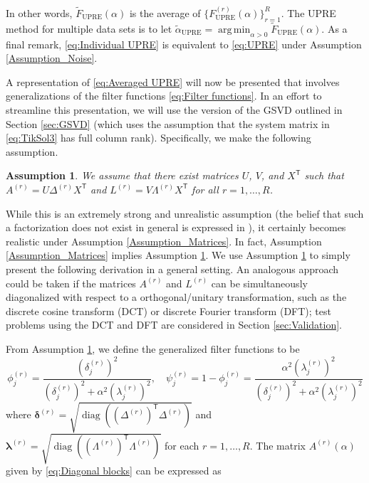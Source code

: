 \documentclass[12pt]{article}
\newcommand{\trans}[1]{{#1}^\mathsf{T}}	%
\DeclareMathOperator{\diag}{diag}	%
\newcommand{\regparam}{\alpha}  %
\DeclareMathOperator*{\argmin}{arg\,min}
\newcommand{\filt}{\phi}
\newcommand{\mfilt}{\psi}
\newcommand{\U}{F_{\text{UPRE}}}	%
\newcommand{\UBig}{\widetilde{F}_{\text{UPRE}}}	%
\newtheorem{assumption}{Assumption}
\begin{document}
\noindent In other words, $\UBig(\regparam)$ is the average of $\{\U^{(r)}(\regparam)\}_{r=1}^R$. The UPRE method for multiple data sets is to let $\widetilde{\regparam}_{\textrm{UPRE}} = \argmin_{\regparam > 0} \UBig(\regparam)$. As a final remark, \eqref{eq:Individual UPRE} is equivalent to \eqref{eq:UPRE} under Assumption \ref{Assumption_Noise}. \par
A representation of \eqref{eq:Averaged UPRE} will now be presented that involves generalizations of the filter functions \eqref{eq:Filter functions}. In an effort to streamline this presentation, we will use the version of the GSVD outlined in Section \ref{sec:GSVD} (which uses the assumption that the system matrix in \eqref{eq:TikSol3} has full column rank). Specifically, we make the following assumption.
\begin{assumption}
\label{Assumption_Diagonalization}
We assume that there exist matrices $U$, $V$, and $\trans{X}$ such that $A^{(r)} = U{\Delta^{(r)}}\trans{X}$ and  $L^{(r)} = V{\Lambda^{(r)}}\trans{X}$ for all $r = 1,\ldots,R$. 
\end{assumption}
\noindent While this is an extremely strong and unrealistic assumption (the belief that such a factorization does not exist in general is expressed in \cite{Brezinski2003}), it certainly becomes realistic under Assumption \ref{Assumption_Matrices}. In fact, Assumption \ref{Assumption_Matrices} implies Assumption \ref{Assumption_Diagonalization}. We use Assumption \ref{Assumption_Diagonalization} to simply present the following derivation in a general setting. An analogous approach could be taken if the matrices $A^{(r)}$ and $L^{(r)}$ can be simultaneously diagonalized with respect to a orthogonal/unitary transformation, such as the discrete cosine transform (DCT) or discrete Fourier transform (DFT); test problems using the DCT and DFT are considered in Section \ref{sec:Validation}. \par
From Assumption \ref{Assumption_Diagonalization}, we define the generalized filter functions to be
\begin{equation}
\label{eq:Filter functions 2}
\filt^{(r)}_j = \frac{\left(\delta^{(r)}_j\right)^2}{\left(\delta^{(r)}_j\right)^2 + \regparam^2 \left(\lambda^{(r)}_j\right)^2}, \quad \mfilt^{(r)}_j = 1 - \filt^{(r)}_j = \frac{\regparam^2 \left(\lambda^{(r)}_j\right)^2}{\left(\delta^{(r)}_j\right)^2 + \regparam^2 \left(\lambda^{(r)}_j\right)^2}
\end{equation}
where $\bm{\delta}^{(r)} = \sqrt{\diag(\trans{(\Delta^{(r)})}\Delta^{(r)})}$ and $\bm{\lambda}^{(r)} = \sqrt{\diag(\trans{(\Lambda^{(r)})}\Lambda^{(r)})}$ for each $r = 1,\ldots,R$. The matrix $A^{(r)}(\regparam)$ given by \eqref{eq:Diagonal blocks} can be expressed as
\end{document}
